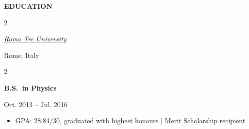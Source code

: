 \documentclass[
  18,
]{article}
\begin{document}
\begin{large}{\bf EDUCATION}
  \begin{multicols}{2}
    \begin{flushleft}{\href{https://www.uniroma3.it/}{\textit{Roma Tre University}}}\end{flushleft}
    \begin{flushright}Rome, Italy\end{flushright}
  \end{multicols}
  \vspace{-0.15cm}
  \begin{multicols}{2}
    \begin{flushleft}
    \textbf{B.S.\ in Physics}
    \end{flushleft}
    \begin{flushright}Oct. 2013 -- Jul. 2016\end{flushright}
  \end{multicols}
  \vspace{-0.2cm}
  \begin{itemize}
    \item GPA: 28.84/30, graduated with highest honours | Merit Scholarship recipient
  \end{itemize}

\end{large}

\vspace{9pt}
\end{document}
